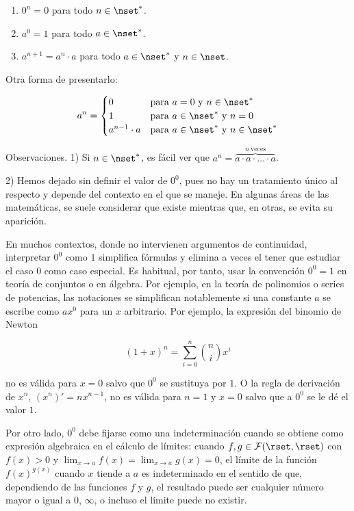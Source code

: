 \begin{enumerate}
  \item $0^n = 0$ para todo $n \in \nset^*$.
  \item $a^0 = 1$ para todo $a \in \nset^*$.
  \item $a^{n+1} = a^n \cdot a$ para todo $a \in \nset^*$ y $n \in \nset$.
\end{enumerate}

\noindent Otra forma de presentarlo:

$$
  a^n =
  \begin{cases}
    0 & \text{para} \ a = 0 \ \text{y} \ n \in \nset^* \\
    1 & \text{para} \ a \in \nset^* \ \text{y} \ n = 0 \\
    a^{n-1} \cdot a & \text{para} \ a \in \nset^* \ \text{y} \ n \in \nset^*
  \end{cases}
$$

Observaciones. 1) Si $n \in \nset^*$, es fácil ver que $a^n = \overbrace{a
\cdot a \cdot \dots \cdot a}^{n \ \text{veces}}$.

2) Hemos dejado sin definir el valor de $0^0$, pues no hay un tratamiento
único al respecto y depende del contexto en el que se maneje. En algunas
áreas de las matemáticas, se suele considerar que existe mientras que, en
otras, se evita su aparición.

En muchos contextos, donde no intervienen argumentos de continuidad,
interpretar $0^0$ como $1$ simplifica fórmulas y elimina a veces el tener
que estudiar el caso $0$ como caso especial. Es habitual, por tanto, usar la
convención $0^0 = 1$ en teoría de conjuntos o en álgebra. Por ejemplo, en la
teoría de polinomios o series de potencias, las notaciones se simplifican
notablemente si una constante $a$ se escribe como $ax^0$ para un $x$
arbitrario. Por ejemplo, la expresión del binomio de Newton

$$ (1 + x)^n = \sum_{i=0}^{n} \binom{n}{i} x^i $$

\noindent no es válida para $x = 0$ salvo que $0^0$ se sustituya por $1$. O
la regla de derivación de $x^n$, $(x^n)' = nx^{n-1}$, no es válida para $n =
1$ y $x = 0$ salvo que a $0^0$ se le dé el valor $1$.

Por otro lado, $0^0$ debe fijarse como una indeterminación cuando se obtiene
como expresión algebraica en el cálculo de límites: cuando $f, g \in
\mathcal{F}(\rset, \rset)$ con $f(x) > 0$ y $\lim_{x \to a} f(x) = \lim_{x
\to a} g(x) = 0$, el límite de la función $f(x)^{g(x)}$ cuando $x$ tiende a
$a$ es indeterminado en el sentido de que, dependiendo de las funciones $f$
y $g$, el resultado puede ser cualquier número mayor o igual a $0$,
$\infty$, o incluso el límite puede no existir.

